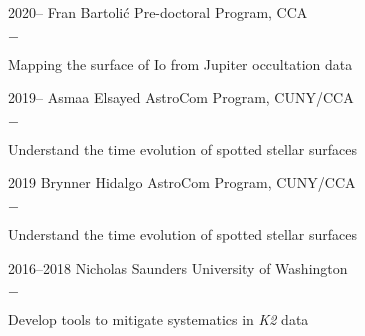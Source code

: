 \documentclass[]{luger-cv} %
\begin{document}
\begin{entrylist}
    \entry
    {2020--}
    {Fran Bartoli\'c}
    {Pre-doctoral Program, CCA}
    {%
        \vspace{-1em}
        \begin{list}{{\color{numcolor}$-$}}{\cvlist}
            \item Mapping the surface of Io from Jupiter occultation data
        \end{list}
    }

    \entry
    {2019--}
    {Asmaa Elsayed}
    {AstroCom Program, CUNY/CCA}
    {%
        \vspace{-1em}
        \begin{list}{{\color{numcolor}$-$}}{\cvlist}
            \item Understand the time evolution of spotted stellar surfaces
        \end{list}
    }

    \entry
    {2019}
    {Brynner Hidalgo}
    {AstroCom Program, CUNY/CCA}
    {%
        \vspace{-1em}
        \begin{list}{{\color{numcolor}$-$}}{\cvlist}
            \item Understand the time evolution of spotted stellar surfaces
        \end{list}
    }

    \entry
    {2016--2018}
    {Nicholas Saunders}
    {University of Washington}
    {%
        \vspace{-1em}
        \begin{list}{{\color{numcolor}$-$}}{\cvlist}
            \item Develop tools to mitigate systematics in \emph{K2} data
        \end{list}
    }


\end{entrylist}

\end{document}
